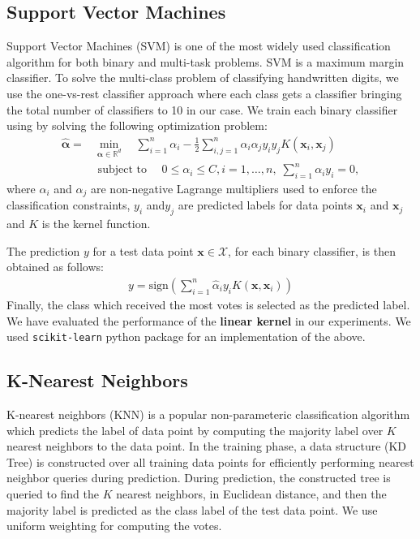 \documentclass[10pt]{scrartcl}
\newcommand{\R}{\mathbb{R}}                       %
\newcommand{\vx}{\mathbf{x}}                        %
\newcommand{\dX}{\mathcal{X}}                     %
\newcommand{\valpha}{\boldsymbol{\alpha}}  %
\begin{document}
\subsection*{Support Vector Machines}
Support Vector Machines (SVM) is one of the most widely used classification algorithm for both binary and multi-task problems.
SVM is a maximum margin classifier. To solve the multi-class problem of classifying handwritten digits, we use the one-vs-rest classifier approach where each class gets a classifier bringing the total number of classifiers to 10 in our case. We train each binary classifier using by solving the following optimization problem:
\begin{align*}
\hat{\valpha} = 
& \min_{\valpha \in \R^d}  \quad \sum_{i=1}^{n} \alpha_i - \frac{1}{2} \sum_{i,j=1}^{n} \alpha_i \alpha_j y_i y_j K(\vx_i,\vx_j) \\ 
& \text{ subject to } \quad  0 \leq \alpha_i \leq C, i=1,\ldots,n, \;  \sum_{i=1}^{n} \alpha_i y_i = 0,
\end{align*}
where $\alpha_i$ and $\alpha_j$ are non-negative Lagrange multipliers  used to enforce the classification constraints, 
$y_i$ and$y_j$ are predicted labels for data points $\vx_i$  and $\vx_j$ and $K$ is the kernel function.  

The prediction $y$ for a test data point $\vx \in \dX$, for each binary classifier, is then obtained as follows:
\begin{align*}
y = \mathrm{sign} \left( \sum_{i=1}^n \hat{\alpha}_i y_i K(\vx, \vx_i) \right)
\end{align*}
Finally, the class which received the most votes is selected as the predicted label. We have evaluated the performance of the \textbf{linear kernel}
in our experiments. We used \texttt{scikit-learn} python package for an implementation of the above.

\subsection*{K-Nearest Neighbors}
K-nearest neighbors (KNN) is a popular non-parameteric classification algorithm which predicts the label of data point
by computing the majority label over $K$ nearest neighbors to the data point. In the training phase, 
a data structure (KD Tree) is constructed over all training data points for efficiently performing nearest neighbor queries during prediction.
During prediction, the constructed tree is queried to find the $K$ nearest neighbors, in Euclidean distance,
 and then the majority label is predicted as the class label of the test data point. We use uniform weighting for computing the votes.
\end{document}
